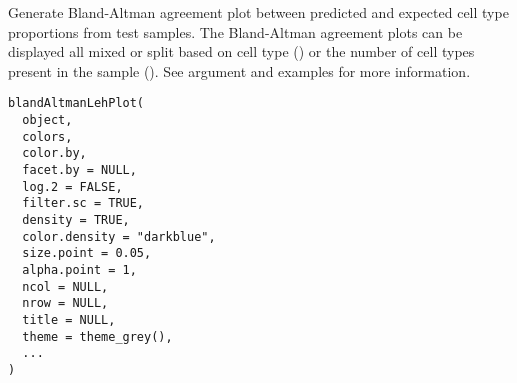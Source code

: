 \documentclass[a4paper]{book}
\begin{document}
%
\begin{Description}\relax
Generate  Bland-Altman agreement plot between predicted and expected cell
type proportions from test samples. The  Bland-Altman agreement plots can be
displayed all mixed or split based on cell type () or the
number of cell types present in the sample (). See 
argument and examples for more information.
\end{Description}
%
\begin{Usage}
\begin{verbatim}
blandAltmanLehPlot(
  object,
  colors,
  color.by,
  facet.by = NULL,
  log.2 = FALSE,
  filter.sc = TRUE,
  density = TRUE,
  color.density = "darkblue",
  size.point = 0.05,
  alpha.point = 1,
  ncol = NULL,
  nrow = NULL,
  title = NULL,
  theme = theme_grey(),
  ...
)
\end{verbatim}
\end{Usage}
%
\end{document}
